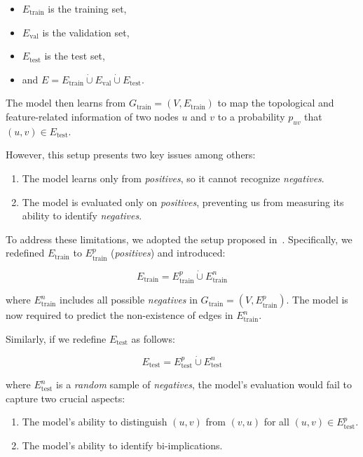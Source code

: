 \begin{itemize}
    \item $E_{\text{train}}$ is the training set,
    \item $E_{\text{val}}$ is the validation set,
    \item $E_{\text{test}}$ is the test set,
    \item and $E = E_{\text{train}} \dot{\cup} E_{\text{val}} \dot{\cup} E_{\text{test}}$.
\end{itemize}

The model then learns from $G_{\text{train}} = (V, E_{\text{train}})$ to map the topological and
feature-related information of two nodes $u$ and $v$ to a probability $p_{uv}$ that
$(u, v) \in E_{\text{test}}$.

However, this setup presents two key issues among others:

\begin{enumerate}
    \item The model learns only from \emph{positives}, so it cannot recognize \emph{negatives}.
    \item The model is evaluated only on \emph{positives}, preventing us from measuring its ability
    to identify \emph{negatives}.
\end{enumerate}

To address these limitations, we adopted the setup proposed in~\cite{Salha2019}.
Specifically, we redefined $E_{\text{train}}$ to $E_{\text{train}}^p$ (\emph{positives}) and introduced:

\[
E_{\text{train}} = E_{\text{train}}^p \dot{\cup} E_{\text{train}}^n
\]

where $E_{\text{train}}^n$ includes all possible \emph{negatives} in $G_{\text{train}} = (V, E_{\text{train}}^p)$.
The model is now required to predict the non-existence of edges in $E_{\text{train}}^n$.

Similarly, if we redefine $E_{\text{test}}$ as follows:

\[
E_{\text{test}} = E_{\text{test}}^p \dot{\cup} E_{\text{test}}^n
\]

where $E_{\text{test}}^n$ is a \emph{random} sample of \emph{negatives}, the model's evaluation
would fail to capture two crucial aspects:

\begin{enumerate}
    \item The model's ability to distinguish $(u,v)$ from $(v,u)$ for all $(u,v) \in E_{\text{test}}^p$.
    \item The model's ability to identify bi-implications.
\end{enumerate}

